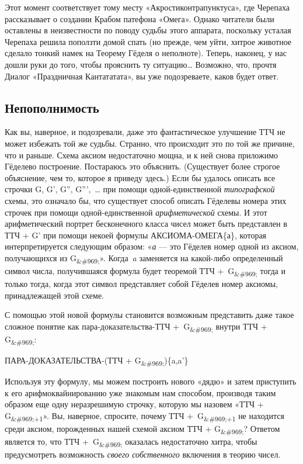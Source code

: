 \documentclass[../main.tex]{subfiles}
\begin{document}
Этот момент соответствует тому месту «Акростиконтрапунктуса», где Черепаха рассказывает о создании Крабом патефона «Омега». Однако читатели были оставлены в неизвестности по поводу судьбы этого аппарата, поскольку усталая Черепаха решила поползти домой спать (но прежде, чем уйти, хитрое животное сделало тонкий намек на Теорему Гёделя о неполноте). Теперь, наконец, у нас дошли руки до того, чтобы прояснить ту ситуацию\ldots{} Возможно, что, прочтя Диалог «Праздничная Кантататата», вы уже подозреваете, каков будет ответ.


\subsection{Непополнимость}

Как вы, наверное, и подозревали, даже это фантастическое улучшение ТТЧ не может избежать той же судьбы. Странно, что происходит это по той же причине, что и раньше. Схема аксиом недостаточно мощна, и к ней снова приложимо Гёделево построение. Постараюсь это объяснить. (Существует более строгое объяснение, чем то, которое я приведу здесь.) Если бы удалось описать все строчки G, G', G'', G''',~\ldots{} при помощи одной-единственной \emph{типографской} схемы, это означало бы, что существует способ описать Гёделевы номера этих строчек при помощи одной-единственной \emph{арифметической} схемы. И этот арифметический портрет бесконечного класса чисел может быть представлен в ТТЧ + G' при помощи некоей формулы АКСИОМА-ОМЕГА\{а\}, которая интерпретируется следующим образом: «\emph{а} --- это Гёделев номер одной из аксиом, получающихся из G\textsubscript{\&\#969;}». Когда~\emph{a} заменяется на какой-либо определенный символ числа, получившаяся формула будет теоремой ТТЧ +~G\textsubscript{\&\#969;} тогда и только тогда, когда этот символ представляет собой Гёделев номер аксиомы, принадлежащей этой схеме.

С помощью этой новой формулы становится возможным представить даже такое сложное понятие как пара-доказательства-ТТЧ +~G\textsubscript{\&\#969;} внутри ТТЧ + G\textsubscript{\&\#969;}:

ПАРА-ДОКАЗАТЕЛЬСТВА-(ТТЧ + G\textsubscript{\&\#969;})\{a,a'\}

Используя эту формулу, мы можем построить нового «дядю» и затем приступить к его арифмоквайнированию уже знакомым нам способом, производя таким образом еще одну неразрешимую строчку, которую мы назовем «ТТЧ + G\textsubscript{\&\#969;+1}». Вы, наверное, спросите, почему ТТЧ +~G\textsubscript{\&\#969;+1} не находится среди аксиом, порожденных нашей схемой аксиом ТТЧ + G\textsubscript{\&\#969;}? Ответом является то, что ТТЧ +~G\textsubscript{\&\#969;} оказалась недостаточно хитра, чтобы предусмотреть возможность \emph{своего собственного} включения в теорию чисел.
\end{document}
